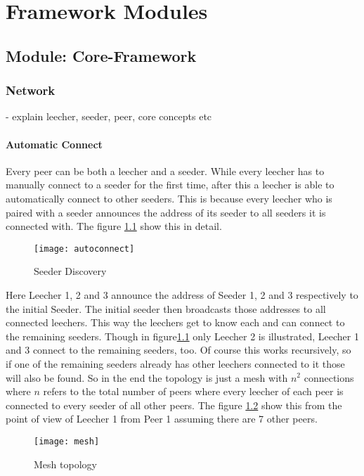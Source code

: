 \chapter{Framework Modules}
\section{Module: Core-Framework}
\label{sec:core}
\subsection{Network}
- explain leecher, seeder, peer, core concepts etc


\subsubsection{Automatic Connect}
\label{subsubsec:autoconnect}

Every peer can be both a leecher and a seeder. While every leecher has to manually connect to a seeder for the first time, after this a leecher is able to automatically connect to other seeders. This is because every leecher who is paired with a seeder announces the address of its seeder to all seeders it is connected with. The figure \ref{fig:autoconnect} show this in detail.

\begin{figure}[b]
\centering
\texttt{[image: autoconnect]}
\caption{Seeder Discovery}
\label{fig:autoconnect}
\end{figure}

\pagebreak

Here Leecher 1, 2 and 3 announce the address of Seeder 1, 2 and 3 respectively to the initial Seeder. The initial seeder then broadcasts those addresses to all connected leechers. This way the leechers get to know each and can connect to the remaining seeders. Though in figure\ref{fig:autoconnect} only Leecher 2 is illustrated, Leecher 1 and 3 connect to the remaining seeders, too. Of course this works recursively, so if one of the remaining seeders already has other leechers connected to it those will also be found. So in the end the topology is just a mesh with $n^2$ connections where $n$ refers to the total number of peers where every leecher of each peer is connected to every seeder of all other peers. The figure \ref{fig:mesh} show this from the point of view of Leecher 1 from Peer 1 assuming there are 7 other peers.

\begin{figure}[ht]
\centering
\texttt{[image: mesh]}
\caption{Mesh topology}
\label{fig:mesh}
\end{figure}

